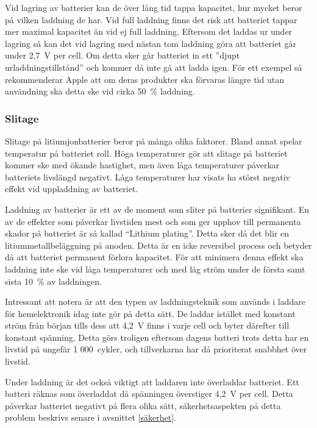 \documentclass[a4paper,12pt]{article}
\begin{document}
Vid lagring av batterier kan de över lång tid tappa kapacitet, hur mycket beror på vilken laddning de har. Vid full laddning finns det risk att batteriet tappar mer maximal kapacitet än vid ej full laddning. Eftersom det laddas ur under lagring så kan det vid lagring med nästan tom laddning göra att batteriet går under 2,7~V per cell. Om detta sker går batteriet in ett ''djupt urladdningstillstånd'' och kommer då inte gå att ladda igen. För ett exempel så rekommenderar Apple att om deras produkter ska förvaras längre tid utan användning ska detta ske vid cirka 50~\% laddning. \cite{apple}

\subsubsection{Slitage}
\label{slitage}
Slitage på litiumjonbatterier beror på många olika faktorer. Bland annat spelar temperatur på batteriet roll. Höga temperaturer gör att slitage på batteriet kommer ske med ökande hastighet, men även låga temperaturer påverkar batteriets livslängd negativt. Låga temperaturer har visats ha störst negativ effekt vid uppladdning av batteriet. \cite{ageing}

Laddning av batterier är ett av de moment som sliter på batterier signifikant. En av de effekter som påverkar livstiden mest \cite{charging} och som ger upphov till permanenta skador på batteriet är så kallad “Lithium plating”. Detta sker då det blir en litiummetallbeläggning på anoden.\cite{nasa} Detta är en icke reversibel process och betyder då att batteriet permanent förlora kapacitet. För att minimera denna effekt ska laddning inte ske vid låga temperaturer och med låg ström under de första samt sista 10~\% av laddningen. \cite{charging-p}

Intressant att notera är att den typen av laddningsteknik som används i laddare för hemelektronik idag inte gör på detta sätt.\cite{apple} De laddar istället med konstant ström från början tills dess att 4,2~V finns i varje cell och byter därefter till konstant spänning. Detta görs troligen eftersom dagens batteri trots detta har en livstid på ungefär 1 000~cykler, och tillverkarna har då prioriterat snabbhet över livstid.

Under laddning är det också viktigt att laddaren inte överladdar batteriet. Ett batteri räknas som överladdat då spänningen överstiger 4,2~V per cell. Detta påverkar batteriet negativt på flera olika sätt, säkerhetsaspekten på detta problem beskrivs senare i avsnittet \ref{säkerhet}.
\end{document}
